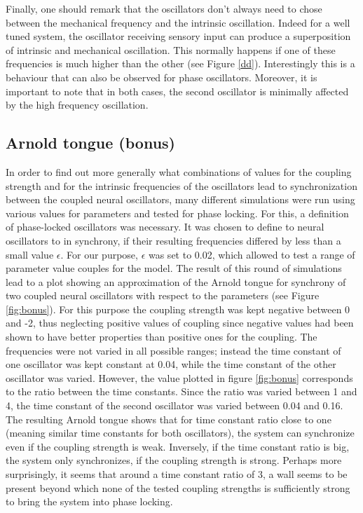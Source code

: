 \documentclass[a4paper]{scrartcl}
\begin{document}
Finally, one should remark that the oscillators don't always need to chose between the mechanical frequency and the intrinsic oscillation. Indeed for a well tuned system, the oscillator receiving sensory input can produce a superposition of intrinsic and mechanical oscillation. This normally happens if one of these frequencies is much higher than the other (see Figure \ref{dd}). Interestingly this is a behaviour that can also be observed for phase oscillators. Moreover, it is important to note that in both cases, the second oscillator is minimally affected by the high frequency oscillation.



\subsection{Arnold tongue (bonus)}

In order to find out more generally what combinations of values for the coupling strength and for the intrinsic frequencies of the oscillators lead to synchronization between the coupled neural oscillators, many different simulations were run using various values for parameters and tested for phase locking. For this, a definition of phase-locked oscillators was necessary. It was chosen to define to neural oscillators to in synchrony, if their resulting frequencies differed by less than a small value $\epsilon$. For our purpose, $\epsilon$ was set to 0.02, which allowed to test a range of parameter value couples for the model. The result of this round of simulations lead to a plot showing an approximation of the Arnold tongue for synchrony of two coupled neural oscillators with respect to the parameters (see Figure \ref{fig:bonus}). For this purpose the coupling strength was kept negative between 0 and -2, thus neglecting positive values of coupling since negative values had been shown to have better properties than positive ones for the coupling. The frequencies were not varied in all possible ranges; instead the time constant of one oscillator was kept constant at 0.04, while the time constant of the other oscillator was varied. However, the value plotted in figure \ref{fig:bonus} corresponds to the ratio between the time constants. Since the ratio was varied between 1 and 4, the time constant of the second oscillator was varied between 0.04 and 0.16. The resulting Arnold tongue shows that for time constant ratio close to one (meaning similar time constants for both oscillators), the system can synchronize even if the coupling strength is weak. Inversely, if the time constant ratio is big, the system only synchronizes, if the coupling strength is strong. Perhaps more surprisingly, it seems that around a time constant ratio of 3, a wall seems to be present beyond which none of the tested coupling strengths is sufficiently strong to bring the system into phase locking.
\end{document}
